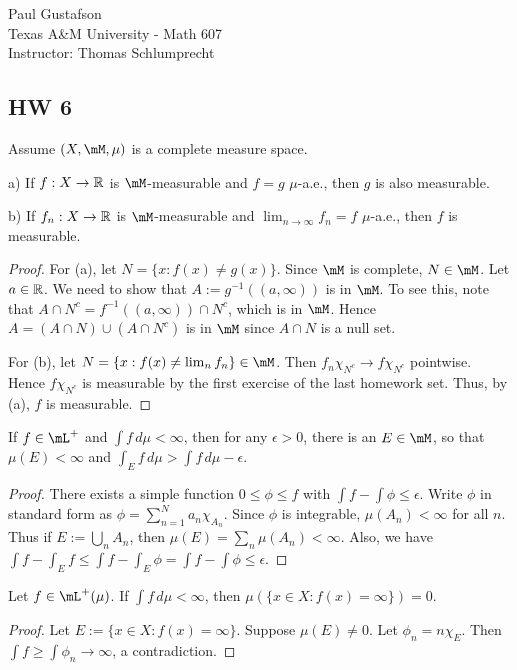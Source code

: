 \documentclass{article}
\begin{document}
\noindent Paul Gustafson\\
\noindent Texas A\&M University - Math 607\\ 
\noindent Instructor: Thomas Schlumprecht

\subsection*{HW 6}
 Assume $(X, \mM, \mu)$ is a complete measure space.

a) If $f : X \to \mathbb{R}$ is $\mM$-measurable and $f = g$ $\mu$-a.e., then $g$ is also measurable.

b) If $f_n : X \to \mathbb{R}$ is $\mM$-measurable and $\lim_{n \to \infty} f_n = f$ $\mu$-a.e., then $f$ is measurable.

\begin{proof}
For (a), let $N = \{x : f(x) \neq g(x)\}$. Since $\mM$ is complete, $N \in \mM$.  Let $a \in \mathbb{R}$.  We need to show that $A := g^{-1}((a,\infty))$ is in $\mM$.  To see this, note that $A \cap N^c = f^{-1}((a,\infty)) \cap N^c$, which is in $\mM$.  Hence $A = (A \cap N) \cup (A \cap N^c)$ is in $\mM$ since $A \cap N$ is a null set.

For (b),  let $N = \{x : f(x) \neq \lim_n f_n \} \in \mM$.  Then $f_n \chi_{N^c} \to f \chi_{N^c}$ pointwise. Hence $f \chi_{N^c}$ is measurable by the first exercise of the last homework set.  Thus, by (a), $f$ is measurable.
\end{proof}

 If $f \in \mL^+$ and $\int f \,d \mu < \infty$, then for any $\epsilon > 0$, there is an $E \in \mM$, so that $\mu(E) < \infty$ and $\int_E f \,d\mu > \int f\,d \mu - \epsilon$.

\begin{proof}
There exists a simple function $0 \le \phi \le f$ with $\int f - \int \phi \le \epsilon$.  Write $\phi$ in standard form as $\phi = \sum_{n=1}^N a_n \chi_{A_n}$.  Since $\phi$ is integrable,  $\mu(A_n) < \infty$ for all $n$.  Thus if $E := \bigcup_n A_n$, then $\mu(E) = \sum_n \mu(A_n) < \infty$. Also, we have $\int f - \int_E f \le \int f - \int_E \phi = \int f - \int \phi \le \epsilon$.
\end{proof}

 Let $f \in \mL^+(\mu)$. If $\int f \, d\mu < \infty$, then $\mu(\{x \in X : f(x) = \infty \}) = 0$.

\begin{proof}
Let $E := \{x \in X : f(x) = \infty \}$.  Suppose $\mu(E) \neq 0$.  Let $\phi_n = n \chi_E$.  Then $\int f \ge \int \phi_n \to \infty$, a contradiction.
\end{proof}
\end{document}
